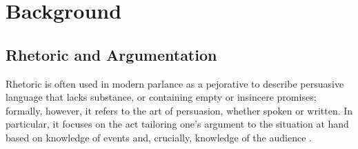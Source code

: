 \chapter{Background}
\label{background}


\section{Rhetoric and Argumentation}
\label{background:rhetoric}
Rhetoric is often used in modern parlance as a pejorative to describe persuasive language that lacks substance, or containing empty or insincere promises; formally, however, it refers to the art of persuasion, whether spoken or written. In particular, it focuses on the act tailoring one's argument to the situation at hand based on knowledge of events and, crucially, knowledge of the audience \citep{Corbett1999}.

